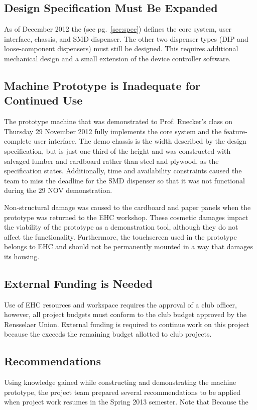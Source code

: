 \documentclass[12pt,draft,oneside]{article}
\begin{document}
\subsection{Design Specification Must Be Expanded}
As of December 2012 the  (see pg.~\ref{sec:spec}) defines the core system, user interface, chassis, and SMD dispenser. The other two dispenser types (DIP and loose-component dispensers) must still be designed. This requires additional mechanical design and a small extension of the device controller software.

\subsection{Machine Prototype is Inadequate for Continued Use}
The prototype machine that was demonstrated to Prof. Ruecker's class on Thursday 29 November 2012 fully implements the core system and the feature-complete user interface. The demo chassis is the width described by the design specification, but is just one-third of the height and was constructed with salvaged lumber and cardboard rather than steel and plywood, as the specification states. Additionally, time and availability constraints caused the team to miss the deadline for the SMD dispenser so that it was not functional during the 29 NOV demonstration.

Non-structural damage was caused to the cardboard and paper panels when the prototype was returned to the EHC workshop. These cosmetic damages impact the viability of the prototype as a demonstration tool, although they do not affect the functionality. Furthermore, the touchscreen used in the prototype belongs to EHC and should not be permanently mounted in a way that damages its housing.

\subsection{External Funding is Needed}
Use of EHC resources and workspace requires the approval of a club officer, however, all project budgets must conform to the club budget approved by the Rensselaer Union. External funding is required to continue work on this project because the  exceeds the remaining budget allotted to club projects.

\subsection{Recommendations}
Using knowledge gained while constructing and demonstrating the machine prototype, the project team prepared several recommendations to be applied when project work resumes in the Spring 2013 semester. Note that Because the
\end{document}

